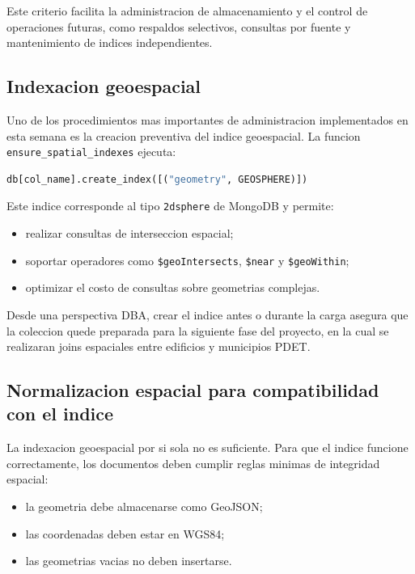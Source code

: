 \documentclass[12pt]{article}
\begin{document}
Este criterio facilita la administracion de almacenamiento y el control de operaciones futuras, como respaldos selectivos, consultas por fuente y mantenimiento de indices independientes.

\subsection{Indexacion geoespacial}

Uno de los procedimientos mas importantes de administracion implementados en esta semana es la creacion preventiva del indice geoespacial. La funcion \texttt{ensure\_spatial\_indexes} ejecuta:

\begin{lstlisting}[style=basicstyle,language=Python]
db[col_name].create_index([("geometry", GEOSPHERE)])
\end{lstlisting}

Este indice corresponde al tipo \texttt{2dsphere} de MongoDB y permite:

\begin{itemize}[leftmargin=*]
    \item realizar consultas de interseccion espacial;
    \item soportar operadores como \texttt{\$geoIntersects}, \texttt{\$near} y \texttt{\$geoWithin};
    \item optimizar el costo de consultas sobre geometrias complejas.
\end{itemize}

Desde una perspectiva DBA, crear el indice antes o durante la carga asegura que la coleccion quede preparada para la siguiente fase del proyecto, en la cual se realizaran joins espaciales entre edificios y municipios PDET.

\subsection{Normalizacion espacial para compatibilidad con el indice}

La indexacion geoespacial por si sola no es suficiente. Para que el indice funcione correctamente, los documentos deben cumplir reglas minimas de integridad espacial:

\begin{itemize}[leftmargin=*]
    \item la geometria debe almacenarse como GeoJSON;
    \item las coordenadas deben estar en WGS84;
    \item las geometrias vacias no deben insertarse.
\end{itemize}
\end{document}
